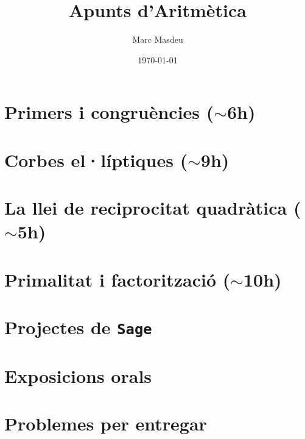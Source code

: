 \documentclass[titlepage,12pt]{article}
\title{Apunts d'Aritmètica}
\author{Marc Masdeu}
\date{\today}
\theoremstyle{definition}
\theoremstyle{plain}
\begin{document}
\maketitle
\setcounter{tocdepth}{2}
\tableofcontents

\newpage
\section{Primers i congruències \texorpdfstring{($\sim$6h)}{}}


 \newpage
 
\section{Corbes el·líptiques (\texorpdfstring{$\sim$9h}{})}


\newpage

\section{La llei de reciprocitat quadràtica (\texorpdfstring{$\sim$5h}{})}
 
 
\newpage

\section{Primalitat i factorització (\texorpdfstring{$\sim$10h}{})}


 \newpage
 
 \appendix

 \section{Projectes de \texttt{Sage}}
 
 
 \newpage
 
 \section{Exposicions orals}
 
 
 \newpage
 
  \section{Problemes per entregar}
 

 
\end{document}
